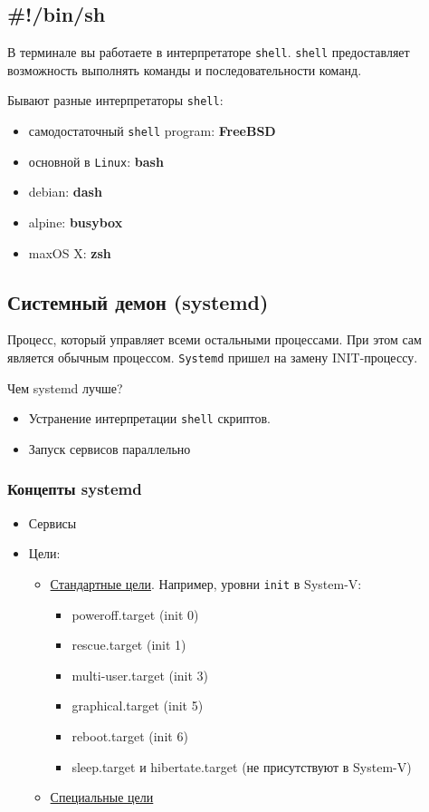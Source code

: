 \subsection{\#!/bin/sh}

В терминале вы работаете в интерпретаторе \texttt{shell}. \texttt{shell} предоставляет возможность выполнять
команды и последовательности команд.

Бывают разные интерпретаторы \texttt{shell}:
\begin{itemize}
	\item самодостаточный \texttt{shell} program: \textbf{FreeBSD}
	\item основной в \texttt{Linux}: \textbf{bash}
	\item debian: \textbf{dash}
	\item alpine: \textbf{busybox}
	\item maxOS X: \textbf{zsh}
\end{itemize}

\subsection{Системный демон (systemd)}
\begin{Def}
Процесс, который управляет всеми остальными процессами. При этом сам является обычным процессом. \texttt{Systemd} пришел на замену INIT-процессу.

\end{Def}

Чем systemd лучше?
\begin{itemize}
	\item Устранение интерпретации \texttt{shell} скриптов. 
	\item Запуск сервисов параллельно
\end{itemize}

\subsubsection{Концепты systemd}

\begin{itemize}
	\item Сервисы
	\item Цели:
		\begin{itemize}
			\item \underline{Стандартные цели}. Например, уровни \texttt{init} в System-V:
				\begin{itemize}
					\item poweroff.target (init 0)
					\item rescue.target (init 1)
					\item multi-user.target (init 3)
					\item graphical.target (init 5)
					\item reboot.target (init 6)
					\item sleep.target и hibertate.target (не присутствуют в System-V)
				\end{itemize}
			\item \underline{Специальные цели}
		\end{itemize}
\end{itemize}

